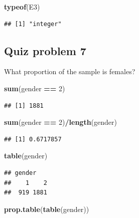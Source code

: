 \documentclass[]{book}
\newenvironment{Shaded}{\begin{snugshade}}{\end{snugshade}}
\newcommand{\DecValTok}[1]{\textcolor[rgb]{0.00,0.00,0.81}{#1}}
\newcommand{\KeywordTok}[1]{\textcolor[rgb]{0.13,0.29,0.53}{\textbf{#1}}}
\newcommand{\NormalTok}[1]{#1}
\newcommand{\OperatorTok}[1]{\textcolor[rgb]{0.81,0.36,0.00}{\textbf{#1}}}
\newcommand{\StringTok}[1]{\textcolor[rgb]{0.31,0.60,0.02}{#1}}
\begin{document}
\begin{Shaded}
\begin{Highlighting}[]
\KeywordTok{typeof}\NormalTok{(E3)}
\end{Highlighting}
\end{Shaded}

\begin{verbatim}
## [1] "integer"
\end{verbatim}

\hypertarget{quiz-problem-7}{%
\subsection{Quiz problem 7}\label{quiz-problem-7}}

What proportion of the sample is females?

\begin{Shaded}
\begin{Highlighting}[]
\KeywordTok{sum}\NormalTok{(gender }\OperatorTok{==}\StringTok{ }\DecValTok{2}\NormalTok{)}
\end{Highlighting}
\end{Shaded}

\begin{verbatim}
## [1] 1881
\end{verbatim}

\begin{Shaded}
\begin{Highlighting}[]
\KeywordTok{sum}\NormalTok{(gender }\OperatorTok{==}\StringTok{ }\DecValTok{2}\NormalTok{)}\OperatorTok{/}\KeywordTok{length}\NormalTok{(gender)}
\end{Highlighting}
\end{Shaded}

\begin{verbatim}
## [1] 0.6717857
\end{verbatim}

\begin{Shaded}
\begin{Highlighting}[]
\KeywordTok{table}\NormalTok{(gender)}
\end{Highlighting}
\end{Shaded}

\begin{verbatim}
## gender
##    1    2 
##  919 1881
\end{verbatim}

\begin{Shaded}
\begin{Highlighting}[]
\KeywordTok{prop.table}\NormalTok{(}\KeywordTok{table}\NormalTok{(gender))}
\end{Highlighting}
\end{Shaded}
\end{document}
